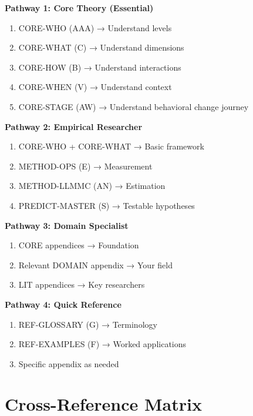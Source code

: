 \begin{tcolorbox}[colback=green!5!white, colframe=green!75!black, 
    title=Recommended Reading Pathways]

\textbf{Pathway 1: Core Theory (Essential)}
\begin{enumerate}[nosep]
\item CORE-WHO (AAA) → Understand levels
\item CORE-WHAT (C) → Understand dimensions
\item CORE-HOW (B) → Understand interactions
\item CORE-WHEN (V) → Understand context
\item CORE-STAGE (AW) → Understand behavioral change journey
\end{enumerate}

\textbf{Pathway 2: Empirical Researcher}
\begin{enumerate}[nosep]
\item CORE-WHO + CORE-WHAT → Basic framework
\item METHOD-OPS (E) → Measurement
\item METHOD-LLMMC (AN) → Estimation
\item PREDICT-MASTER (S) → Testable hypotheses
\end{enumerate}

\textbf{Pathway 3: Domain Specialist}
\begin{enumerate}[nosep]
\item CORE appendices → Foundation
\item Relevant DOMAIN appendix → Your field
\item LIT appendices → Key researchers
\end{enumerate}

\textbf{Pathway 4: Quick Reference}
\begin{enumerate}[nosep]
\item REF-GLOSSARY (G) → Terminology
\item REF-EXAMPLES (F) → Worked applications
\item Specific appendix as needed
\end{enumerate}

\end{tcolorbox}

\section{Cross-Reference Matrix}
\label{sec:index-crossref}

